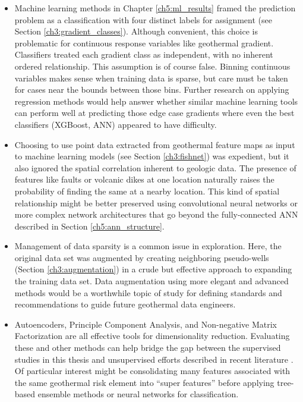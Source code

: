 \begin{itemize}
    \item Machine learning methods in Chapter \ref{ch5:ml_results} framed the prediction problem as a classification with four distinct labels for assignment (see Section \ref{ch3:gradient_classes}). Although convenient, this choice is problematic for continuous response variables like geothermal gradient. Classifiers treated each gradient class as independent, with no inherent ordered relationship. This assumption is of course false. Binning continuous variables makes sense when training data is sparse, but care must be taken for cases near the bounds between those bins. Further research on applying regression methods would help answer whether similar machine learning tools can perform well at predicting those edge case gradients where even the best classifiers (XGBoost, ANN) appeared to have difficulty.
    \item Choosing to use point data extracted from geothermal feature maps as input to machine learning models (see Section \ref{ch3:fishnet}) was expedient, but it also ignored the spatial correlation inherent to geologic data. The presence of features like faults or volcanic dikes at one location naturally raises the probability of finding the same at a nearby location. This kind of spatial relationship might be better preserved using convolutional neural networks or more complex network architectures that go beyond the fully-connected ANN described in Section \ref{ch5:ann_structure}.
    \item Management of data sparsity is a common issue in exploration. Here, the original data set was augmented by creating neighboring pseudo-wells (Section \ref{ch3:augmentation}) in a crude but effective approach to expanding the training data set. Data augmentation using more elegant and advanced methods would be a worthwhile topic of study for defining standards and recommendations to guide future geothermal data engineers.
    \item Autoencoders, Principle Component Analysis, and Non-negative Matrix Factorization are all effective tools for dimensionality reduction. Evaluating these and other methods can help bridge the gap between the supervised studies in this thesis and unsupervised efforts described in recent literature \citep{smith_characterizing_2021, pepin_new_2018}. Of particular interest might be consolidating many features associated with the same geothermal risk element into “super features” before applying tree-based ensemble methods or neural networks for classification.

\end{itemize}
